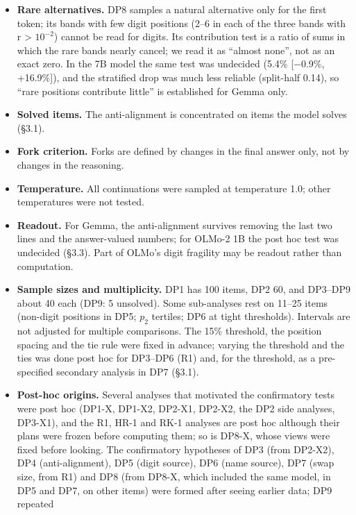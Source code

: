 \documentclass[
  10pt,
  a4paper,
]{article}
\begin{document}
\begin{itemize}
  under the matched swap; the post hoc analyses of earlier runs (R1) suggest it is weak there.
\item
  \textbf{Rare alternatives.} DP8 samples a natural alternative only for the first token; its bands with few digit positions (2--6 in each of the three bands with r \textgreater{} \(10^{-2}\)) cannot
  be read for digits. Its contribution test is a ratio of sums in which the rare bands nearly cancel; we read it as ``almost none'', not as an exact zero. In the 7B model the same test was undecided
  (5.4\% {[}−0.9\%, +16.9\%{]}), and the stratified drop was much less reliable (split-half 0.14), so ``rare positions contribute little'' is established for Gemma only.
\item
  \textbf{Solved items.} The anti-alignment is concentrated on items the model solves (§3.1).
\item
  \textbf{Fork criterion.} Forks are defined by changes in the final answer only, not by changes in the reasoning.
\item
  \textbf{Temperature.} All continuations were sampled at temperature 1.0; other temperatures were not tested.
\item
  \textbf{Readout.} For Gemma, the anti-alignment survives removing the last two lines and the answer-valued numbers; for OLMo-2 1B the post hoc test was undecided (§3.3). Part of OLMo's digit
  fragility may be readout rather than computation.
\item
  \textbf{Sample sizes and multiplicity.} DP1 has 100 items, DP2 60, and DP3--DP9 about 40 each (DP9: 5 unsolved). Some sub-analyses rest on 11--25 items (non-digit positions in DP5; \(p_2\) tertiles;
  DP6 at tight thresholds). Intervals are not adjusted for multiple comparisons. The 15\% threshold, the position spacing and the tie rule were fixed in advance; varying the threshold and the ties was
  done post hoc for DP3--DP6 (R1) and, for the threshold, as a pre-specified secondary analysis in DP7 (§3.1).
\item
  \textbf{Post-hoc origins.} Several analyses that motivated the confirmatory tests were post hoc (DP1-X, DP1-X2, DP2-X1, DP2-X2, the DP2 side analyses, DP3-X1), and the R1, HR-1 and RK-1 analyses are
  post hoc although their plans were frozen before computing them; so is DP8-X, whose views were fixed before looking. The confirmatory hypotheses of DP3 (from DP2-X2), DP4 (anti-alignment), DP5
  (digit source), DP6 (name source), DP7 (swap size, from R1) and DP8 (from DP8-X, which included the same model, in DP5 and DP7, on other items) were formed after seeing earlier data; DP9 repeated

\end{itemize}
\end{document}
